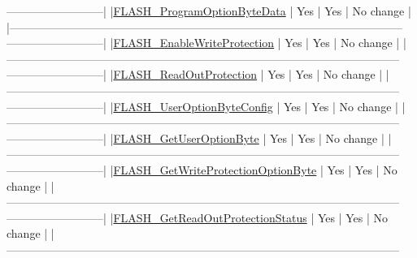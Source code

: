 \begin{DoxyCode}
      --------------------------|
  |\hyperlink{group___f_l_a_s_h___exported___functions_ga1382ff9d4ded8a5c076fde4fff529d21}{FLASH\_ProgramOptionByteData}         |    Yes     |      Yes      | No change 
                                                           |
  |--------------------------------------------------------------------------------------------------------
      --------------------------|
  |\hyperlink{group___f_l_a_s_h___exported___functions_gabad10c15e2d1ff1cb9e1083d08a9e763}{FLASH\_EnableWriteProtection}         |    Yes     |      Yes      | No change 
                                                           |
  |--------------------------------------------------------------------------------------------------------
      --------------------------|
  |\hyperlink{group___f_l_a_s_h___exported___functions_ga0b8d1a8277950c890bbc247bbeafb40f}{FLASH\_ReadOutProtection}             |    Yes     |      Yes      | No change     
                                                       |
  |--------------------------------------------------------------------------------------------------------
      --------------------------|
  |\hyperlink{group___f_l_a_s_h___exported___functions_gaae1c493bb06c930ceb84dedfdb7325f6}{FLASH\_UserOptionByteConfig}          |    Yes     |      Yes      | No change  
                                                          |
  |--------------------------------------------------------------------------------------------------------
      --------------------------|
  |\hyperlink{group___f_l_a_s_h___exported___functions_ga31441647fac5fbb38369613076737943}{FLASH\_GetUserOptionByte}             |    Yes     |      Yes      | No change     
                                                       |
  |--------------------------------------------------------------------------------------------------------
      --------------------------|
  |\hyperlink{group___f_l_a_s_h___exported___functions_gac009e061562c7d36d7d2d00bb1c8aafa}{FLASH\_GetWriteProtectionOptionByte}  |    Yes     |      Yes      | No 
      change                                                      |
  |--------------------------------------------------------------------------------------------------------
      --------------------------|
  |\hyperlink{group___f_l_a_s_h___exported___functions_ga57fe56770ff25b358f3e36bd70632e37}{FLASH\_GetReadOutProtectionStatus}    |    Yes     |      Yes      | No 
      change                                                      |
  |--------------------------------------------------------------------------------------------------------

\end{DoxyCode}
